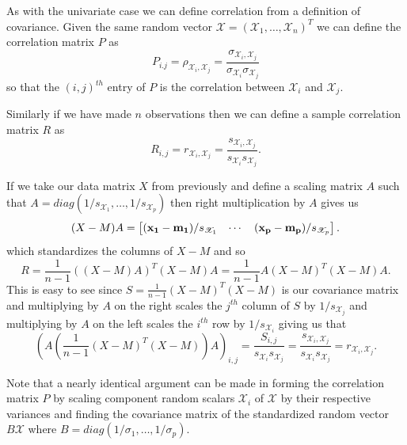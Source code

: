 \documentclass{book}
\newcommand{\bs}[1]{\boldsymbol{#1}}
\newcommand{\rv}[1]{\bs{\mathscr{#1}}}
\begin{document}
As with the univariate case we can define correlation from a definition of covariance. Given the same random vector $\rv{X}=\left(\mathscr{X}_1,\ldots,\mathscr{X}_n\right)^T$ we can define the correlation matrix $P$ as 
$$
P_{i.j}=\rho_{\mathscr{X}_i,\mathscr{X}_j}=\frac{\sigma_{\mathscr{X}_i,\mathscr{X}_j}}{\sigma_{\mathscr{X}_i}\sigma_{\mathscr{X}_j}}
$$
so that the $(i,j)^{th}$ entry of $P$ is the correlation between $\mathscr{X}_i$ and $\mathscr{X}_j$.

Similarly if we have made $n$ observations then we can define a sample correlation matrix $R$ as
$$
R_{i,j}=r_{\mathscr{X}_i,\mathscr{X}_j}=\frac{s_{\mathscr{X}_i,\mathscr{X}_j}}{s_{\mathscr{X}_i}s_{\mathscr{X}_j}}.
$$

If we take our data matrix $X$ from previously and define a scaling matrix $A$ such that $A=diag(1/s_{\mathscr{X}_1},\ldots,1/s_{\mathscr{X}_p})$ then right multiplication by $A$ gives us
$$
(X-M)A=
\begin{bmatrix}
({\bf x_1}-{\bf m_1})/s_{\mathscr{X}_1}& \cdots& ({\bf x_p}-{\bf m_p})/s_{\mathscr{X}_p}
\end{bmatrix}.
$$
which standardizes the columns of $X-M$ and so
$$
R=\frac{1}{n-1}((X-M)A)^T(X-M)A=\frac{1}{n-1}A(X-M)^T(X-M)A.
$$
This is easy to see since $S=\frac{1}{n-1}(X-M)^T(X-M)$ is our covariance matrix and multiplying by $A$ on the right scales the $j^{th}$ column of $S$ by $1/s_{\mathscr{X}_j}$ and multiplying by $A$ on the left scales the $i^{th}$ row by $1/s_{\mathscr{X}_i}$ giving us that
$$
\left(A\left(\frac{1}{n-1}(X-M)^T(X-M)\right)A\right)_{i,j}=\frac{S_{i,j}}{s_{\mathscr{X}_i}s_{\mathscr{X}_j}}=\frac{s_{\mathscr{X}_i,\mathscr{X}_j}}{s_{\mathscr{X}_i}s_{\mathscr{X}_j}}=r_{\mathscr{X}_i,\mathscr{X}_j}.
$$

Note that a nearly identical argument can be made in forming the correlation matrix $P$ by scaling component random scalars $\mathscr{X}_i$ of $\rv{X}$ by their respective variances and finding the covariance matrix of the standardized random vector $B\rv{X}$ where $B=diag(1/\sigma_1,\ldots,1/\sigma_p)$.
\end{document}
